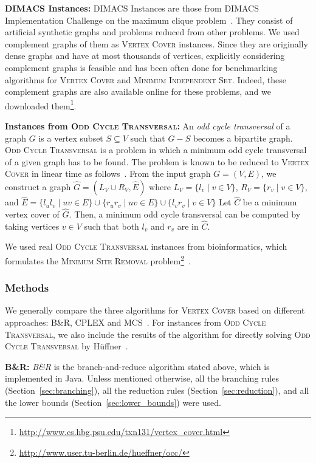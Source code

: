 \documentclass[11pt]{article}
\newcommand{\OCT}{\textsc{Odd Cycle Transversal}\xspace}
\newcommand{\myparagraph}[1]{\vspace{1em}\noindent\textbf{#1:}}
\begin{document}
\myparagraph{DIMACS Instances}
DIMACS Instances are those from DIMACS Implementation Challenge on the maximum clique problem~\cite{datasets/dimacs}.
They consist of artificial synthetic graphs and problems reduced from other problems.
We used complement graphs of them as \textsc{Vertex Cover} instances.
Since they are originally dense graphs and have at most thousands of vertices,
explicitly considering complement graphs is feasible
and has been often done for benchmarking algorithms for
\textsc{Vertex Cover} and \textsc{Minimum Independent Set}.
Indeed, these complement graphs are also available online for these problems,
and we downloaded them\footnote{\url{http://www.cs.hbg.psu.edu/txn131/vertex_cover.html}}.

\myparagraph{Instances from \OCT}
An \emph{odd cycle transversal} of a graph $G$ is a vertex subset $S\subseteq V$ such that $G-S$ becomes a bipartite
graph.
\textsc{Odd Cycle Transversal} is a problem in which a minimum odd cycle transversal of a given graph has to be found.
The problem is known to be reduced to \textsc{Vertex Cover} in linear time as
follows~\cite{DBLP:journals/corr/abs-1203-0833}.
From the input graph $G=(V,E)$, we construct a graph $\hat{G}=(L_V\cup R_V,\hat{E})$ where
$L_V=\{l_v\mid v\in V\}$, $R_V=\{r_v\mid v\in V\}$, and
$\hat{E}=\{l_ul_v\mid uv\in E\}\cup\{r_ur_v\mid uv\in E\}\cup\{l_v r_v\mid v\in V\}$
Let $\hat{C}$ be a minimum vertex cover of $\hat{G}$.
Then, a minimum odd cycle transversal can be computed by taking vertices $v\in V$ such that both $l_v$ and
$r_v$ are in $\hat{C}$.

We used real \textsc{Odd Cycle Transversal} instances from bioinformatics,
which formulates the \textsc{Minimum Site Removal} problem\footnote{\url{http://www.user.tu-berlin.de/hueffner/occ/}}~\cite{oct/huffner09}.




\subsubsection{Methods}
We generally compare the three algorithms for \textsc{Vertex Cover} based on different approaches:
B\&R, CPLEX and MCS~\cite{clique/mcs_walcom10}.
For instances from \OCT, we also include the results of the algorithm for directly solving \OCT
by H{\"u}ffner~\cite{oct/huffner09}.

\myparagraph{B\&R} \emph{B\&R} is the branch-and-reduce algorithm stated above, which is implemented in Java.
Unless mentioned otherwise,
all the branching rules (Section~\ref{sec:branching}),
all the reduction rules (Section~\ref{sec:reduction}),
and all the lower bounds (Section~\ref{sec:lower_bounds})
were used.
\end{document}
